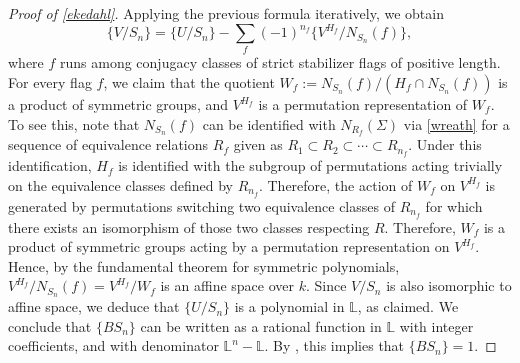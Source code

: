 \documentclass[12 pt]{amsart}
\theoremstyle{plain}
\theoremstyle{definition}
\theoremstyle{remark}
\numberwithin{equation}{section}
\renewcommand{\L}{\mathbb L}
\begin{document}
\begin{proof}[Proof of \autoref{ekedahl}]
Applying the previous formula iteratively, we obtain
\[\{V/S_n\}=\{U/S_n\}-\sum_f (-1)^{n_f}\{V^{H_f}/N_{S_n}(f)\},\]
where $f$ runs among conjugacy classes of strict stabilizer flags of positive length.
For every flag $f$, we claim that the quotient $W_f:=N_{S_n}(f)/(H_f\cap N_{S_n}(f))$ is a product of symmetric groups, and $V^{H_f}$ is a permutation representation of $W_f$. 
To see this, note that $N_{S_n}(f)$ can be identified with $N_{R_f}(\Sigma)$ via
\autoref{wreath} for a sequence of equivalence relations $R_f$ given as $R_1 \subset R_2
\subset \cdots \subset R_{n_f}$.
Under this identification,
$H_f$ is identified with the subgroup of permutations acting trivially on
the equivalence classes defined by $R_{n_f}$.
Therefore, the action of $W_f$ on $V^{H_f}$ is generated by permutations
switching two equivalence classes of
$R_{n_f}$ 
for which there exists an isomorphism of those two classes respecting $R$.
Therefore, $W_f$ 
is a product of symmetric groups acting by a permutation representation on
$V^{H_f}$.
Hence, by the fundamental theorem for symmetric polynomials,
$V^{H_f}/N_{S_n}(f)=V^{H_f}/W_f$ is an affine space over $k$. Since $V/S_n$ is also isomorphic to affine space, we deduce that $\{U/S_n\}$ is a polynomial in $\L$, as claimed.
We conclude that $\{BS_n\}$ can be written as a rational function in $\L$ with integer coefficients, and with denominator $\L^n-\L$. By \cite[Lem.\ 3.5]{ekedahlGeometricInvariantFinite2009}, this implies that $\{BS_n\}=1$.
\end{proof}

%	
%	

 
\end{document}
